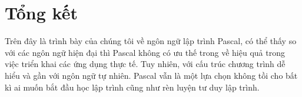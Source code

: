 \chapter{Tổng kết}
Trên đây là trình bày của chúng tôi về ngôn ngữ lập trình Pascal, có thể thấy so với các ngôn ngữ hiện đại thì Pascal không có ưu thế trong về hiệu quả trong việc triển khai các ứng dụng thực tế. Tuy nhiên, với cấu trúc chương trình dễ hiểu và gần với ngôn ngữ tự nhiên. Pascal vẫn là một lựa chọn không tồi cho bất kì ai muốn bắt đầu học lập trình cũng như rèn luyện tư duy lập trình.